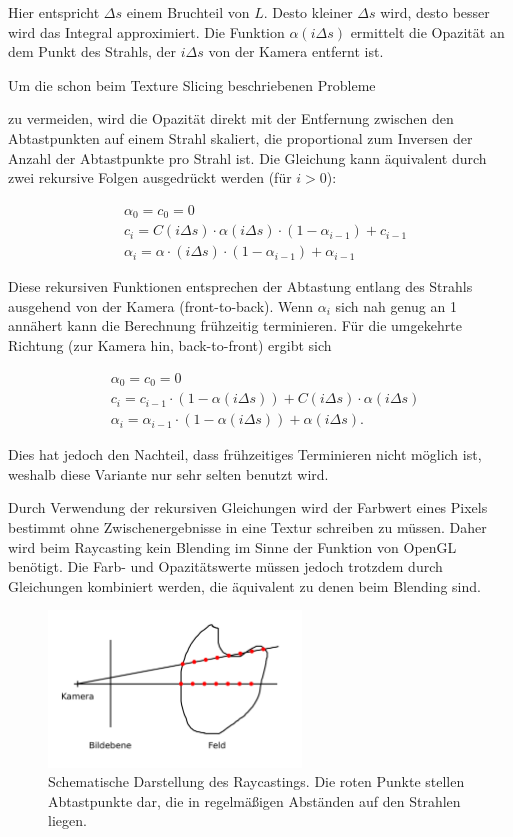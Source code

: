 \documentclass[a4paper,fontsize=12pt,toc=bib,parskip=half,ngerman]{scrartcl}
\begin{document}
Hier entspricht $\Delta s$ einem Bruchteil von $L$. Desto kleiner $\Delta s$ wird, desto besser wird das Integral approximiert. Die Funktion $\alpha(i \Delta s)$ ermittelt die Opazit\"at an dem Punkt des Strahls, der $i \Delta s$ von der Kamera entfernt ist. 

Um die schon beim Texture Slicing beschriebenen Probleme 

 zu vermeiden, wird die Opazit\"at direkt mit der Entfernung zwischen den Abtastpunkten auf einem Strahl skaliert, die proportional zum Inversen der Anzahl der Abtastpunkte pro Strahl ist.
Die Gleichung kann \"aquivalent durch zwei rekursive Folgen ausgedr\"uckt werden (f\"ur $i > 0$):

\begin{align}
&\alpha_0 = c_0 = 0\\
&c_i = C(i\Delta s)\cdot\alpha(i\Delta s)\cdot(1-\alpha_{i-1}) + c_{i-1} \label{RaycastingFormula1}\\
&\alpha_i = \alpha\cdot(i \Delta s)\cdot(1-\alpha_{i-1}) + \alpha_{i-1} \label{RaycastingFormula2}
\end{align} 

Diese rekursiven Funktionen entsprechen der Abtastung entlang des Strahls ausgehend von der Kamera (front-to-back). Wenn $\alpha_i$ sich nah genug an 1 ann\"ahert kann die Berechnung fr\"uhzeitig terminieren. F\"ur die umgekehrte Richtung (zur Kamera hin, back-to-front) ergibt sich

\begin{align}
&\alpha_0 = c_0 = 0\\
&c_i = c_{i-1}\cdot(1 - \alpha(i\Delta s)) + C(i\Delta s)\cdot\alpha(i\Delta s)\\
&\alpha_i = \alpha_{i-1}\cdot(1 - \alpha(i\Delta s)) + \alpha(i \Delta s).
\end{align}

Dies hat jedoch den Nachteil, dass fr\"uhzeitiges Terminieren nicht m\"oglich ist, weshalb diese Variante nur sehr selten benutzt wird.

Durch Verwendung der rekursiven Gleichungen wird der Farbwert eines Pixels bestimmt ohne Zwischenergebnisse in eine Textur schreiben zu m\"ussen. Daher wird beim Raycasting kein Blending im Sinne der Funktion von OpenGL ben\"otigt. Die Farb- und Opazit\"atswerte m\"ussen jedoch trotzdem durch Gleichungen kombiniert werden, die \"aquivalent zu denen beim Blending sind.


\begin{figure}
	\centering
	\includegraphics[width=0.6\textwidth]{pictures/Raycasting}
	\caption{Schematische Darstellung des Raycastings. Die roten Punkte stellen Abtastpunkte dar, die in regelm\"a{\ss}igen Abst\"anden auf den Strahlen liegen.}
	\label{Raycasting}
\end{figure}
\end{document}

